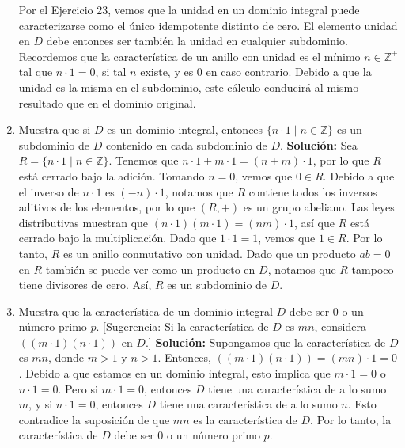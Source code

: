 \begin{enumerate}
	Por el Ejercicio 23, vemos que la unidad en un dominio integral puede caracterizarse como el único idempotente distinto de cero. El elemento unidad en \(D\) debe entonces ser también la unidad en cualquier subdominio. Recordemos que la característica de un anillo con unidad es el mínimo \(n \in \mathbb{Z}^+\) tal que \(n \cdot 1 = 0\), si tal \(n\) existe, y es 0 en caso contrario. Debido a que la unidad es la misma en el subdominio, este cálculo conducirá al mismo resultado que en el dominio original.

	\item Muestra que si $D$ es un dominio integral, entonces $\{n \cdot 1 \mid n \in \mathbb{Z}\}$ es un subdominio de $D$ contenido en cada subdominio de $D$.
	\textbf{Solución:}  
	Sea \(R = \{n \cdot 1 \mid n \in \mathbb{Z}\}\). Tenemos que \(n \cdot 1 + m \cdot 1 = (n+m) \cdot 1\), por lo que \(R\) está cerrado bajo la adición. Tomando \(n=0\), vemos que \(0 \in R\). Debido a que el inverso de \(n \cdot 1\) es \((-n) \cdot 1\), notamos que \(R\) contiene todos los inversos aditivos de los elementos, por lo que \((R, +)\) es un grupo abeliano. Las leyes distributivas muestran que \( (n \cdot 1)(m \cdot 1) = (nm) \cdot 1 \), así que \(R\) está cerrado bajo la multiplicación. Dado que \(1 \cdot 1 = 1\), vemos que \(1 \in R\). Por lo tanto, \(R\) es un anillo conmutativo con unidad. Dado que un producto \(ab = 0\) en \(R\) también se puede ver como un producto en \(D\), notamos que \(R\) tampoco tiene divisores de cero. Así, \(R\) es un subdominio de \(D\).
	
	
	\item Muestra que la característica de un dominio integral $D$ debe ser 0 o un número primo $p$. [Sugerencia: Si la característica de $D$ es $mn$, considera $((m \cdot 1)(n \cdot 1))$ en $D$.] 
	\textbf{Solución:}
	 Supongamos que la característica de $D$ es $mn$, donde $m > 1$ y $n > 1$. Entonces, $((m \cdot 1)(n \cdot 1)) = (mn) \cdot 1 = 0$. Debido a que estamos en un dominio integral, esto implica que $m \cdot 1 = 0$ o $n \cdot 1 = 0$. Pero si $m \cdot 1 = 0$, entonces $D$ tiene una característica de a lo sumo $m$, y si $n \cdot 1 = 0$, entonces $D$ tiene una característica de a lo sumo $n$. Esto contradice la suposición de que $mn$ es la característica de $D$. Por lo tanto, la característica de $D$ debe ser 0 o un número primo $p$.
	 

\end{enumerate}
